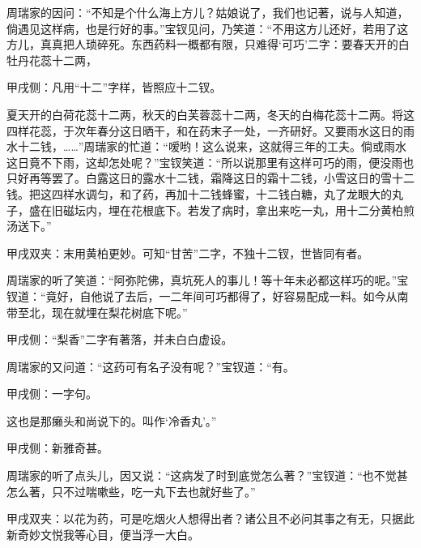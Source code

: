 \begin{parag}
    周瑞家的因问：“不知是个什么海上方儿？姑娘说了，我们也记著，说与人知道，倘遇见这样病，也是行好的事。”宝钗见问，乃笑道：“不用这方儿还好，若用了这方儿，真真把人琐碎死。东西药料一概都有限，只难得‘可巧’二字：要春天开的白牡丹花蕊十二两，\begin{note}甲戌侧：凡用“十二”字样，皆照应十二钗。\end{note}夏天开的白荷花蕊十二两，秋天的白芙蓉蕊十二两，冬天的白梅花蕊十二两。将这四样花蕊，于次年春分这日晒干，和在药末子一处，一齐研好。又要雨水这日的雨水十二钱，……”周瑞家的忙道：“嗳哟！这么说来，这就得三年的工夫。倘或雨水这日竟不下雨，这却怎处呢？”宝钗笑道：“所以说那里有这样可巧的雨，便没雨也只好再等罢了。白露这日的露水十二钱，霜降这日的霜十二钱，小雪这日的雪十二钱。把这四样水调匀，和了药，再加十二钱蜂蜜，十二钱白糖，丸了龙眼大的丸子，盛在旧磁坛内，埋在花根底下。若发了病时，拿出来吃一丸，用十二分黄柏煎汤送下。”\begin{note}甲戌双夹：末用黄柏更妙。可知“甘苦”二字，不独十二钗，世皆同有者。\end{note}
\end{parag}


\begin{parag}
    周瑞家的听了笑道：“阿弥陀佛，真坑死人的事儿！等十年未必都这样巧的呢。”宝钗道：“竟好，自他说了去后，一二年间可巧都得了，好容易配成一料。如今从南带至北，现在就埋在梨花树底下呢。”\begin{note}甲戌侧：“梨香”二字有著落，并未白白虚设。\end{note}周瑞家的又问道：“这药可有名子没有呢？”宝钗道：“有。\begin{note}甲戌侧：一字句。\end{note}这也是那癞头和尚说下的。叫作‘冷香丸’。”\begin{note}甲戌侧：新雅奇甚。\end{note}周瑞家的听了点头儿，因又说：“这病发了时到底觉怎么著？”宝钗道：“也不觉甚怎么著，只不过喘嗽些，吃一丸下去也就好些了。”\begin{note}甲戌双夹：以花为药，可是吃烟火人想得出者？诸公且不必问其事之有无，只据此新奇妙文悦我等心目，便当浮一大白。\end{note}
\end{parag}


